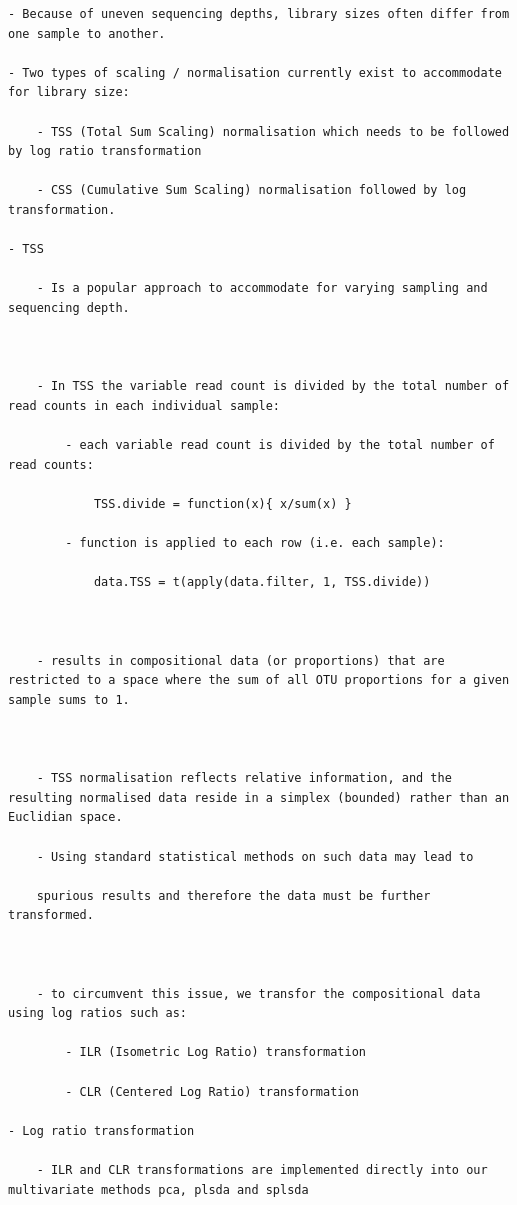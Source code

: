 \documentclass[
]{book}
\begin{document}
\begin{verbatim}
- Because of uneven sequencing depths, library sizes often differ from one sample to another.

- Two types of scaling / normalisation currently exist to accommodate for library size:

    - TSS (Total Sum Scaling) normalisation which needs to be followed by log ratio transformation

    - CSS (Cumulative Sum Scaling) normalisation followed by log transformation.

- TSS

    - Is a popular approach to accommodate for varying sampling and sequencing depth.



    - In TSS the variable read count is divided by the total number of read counts in each individual sample:

        - each variable read count is divided by the total number of read counts:

            TSS.divide = function(x){ x/sum(x) }

        - function is applied to each row (i.e. each sample):

            data.TSS = t(apply(data.filter, 1, TSS.divide))



    - results in compositional data (or proportions) that are restricted to a space where the sum of all OTU proportions for a given sample sums to 1.



    - TSS normalisation reflects relative information, and the resulting normalised data reside in a simplex (bounded) rather than an Euclidian space.

    - Using standard statistical methods on such data may lead to

    spurious results and therefore the data must be further transformed.



    - to circumvent this issue, we transfor the compositional data using log ratios such as:

        - ILR (Isometric Log Ratio) transformation

        - CLR (Centered Log Ratio) transformation

- Log ratio transformation

    - ILR and CLR transformations are implemented directly into our multivariate methods pca, plsda and splsda


\end{verbatim}
\end{document}
